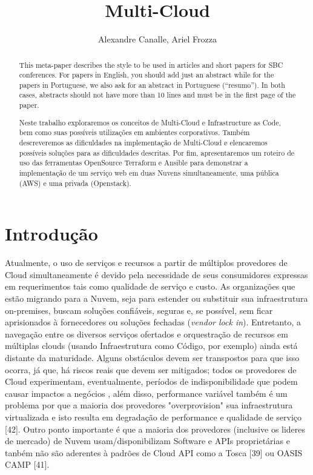 \documentclass[12pt]{article}
\title{Multi-Cloud}
\author{Alexandre Canalle\inst{1}, Ariel Frozza\inst{1}}
\begin{document}

\singlespacing

\maketitle
	
\begin{abstract}
	This meta-paper describes the style to be used in articles and short papers
	for SBC conferences. For papers in English, you should add just an abstract
	while for the papers in Portuguese, we also ask for an abstract in
	Portuguese (``resumo''). In both cases, abstracts should not have more than
	10 lines and must be in the first page of the paper.
\end{abstract}

\begin{abstract} 
	Neste trabalho exploraremos os conceitos de Multi-Cloud e Infrastructure as Code, bem como suas possíveis utilizações em ambientes corporativos. Também descreveremos as dificuldades na implementação de Multi-Cloud e elencaremos possíveis soluções para as dificuldades descritas.  Por fim, apresentaremos um roteiro de uso das ferramentas OpenSource Terraform e Ansible para demonstrar a implementação de um serviço web em duas Nuvens simultaneamente, uma pública (AWS) e uma privada (Openstack).
\end{abstract}

	\section{Introdução}
	    Atualmente, o uso de serviços e recursos a partir de múltiplos provedores de Cloud simultaneamente é devido pela necessidade de seus consumidores expressas em requerimentos tais como qualidade de serviço e custo. As organizações que estão migrando para a Nuvem, seja para estender ou substituir sua infraestrutura on-premises, buscam soluções confiáveis, seguras e, se possível, sem ficar aprisionados à fornecedores ou soluções fechadas (\textit{vendor lock in}). Entretanto, a navegação entre os diversos serviços ofertados e orquestração de recursos em múltiplas clouds (usando Infraestrutura como Código, por exemplo) ainda está distante da maturidade. Alguns obstáculos devem ser transpostos para que isso ocorra, já que, há riscos reais que devem ser mitigados; todos os provedores de Cloud experimentam, eventualmente, períodos de indisponibilidade que podem causar impactos a negócios \cite{1}, além disso, performance variável também é um problema por que a maioria dos provedores "overprovision" sua infraestrutura virtualizada e isto resulta em degradação de performance e qualidade de serviço [42]. Outro ponto importante é que a maioria dos provedores (inclusive os lideres de mercado) de Nuvem usam/disponibilizam Software e APIs proprietárias e tanbém não são aderentes à padrões de Cloud API como a Tosca [39] ou OASIS CAMP [41].
	    
\end{document}
